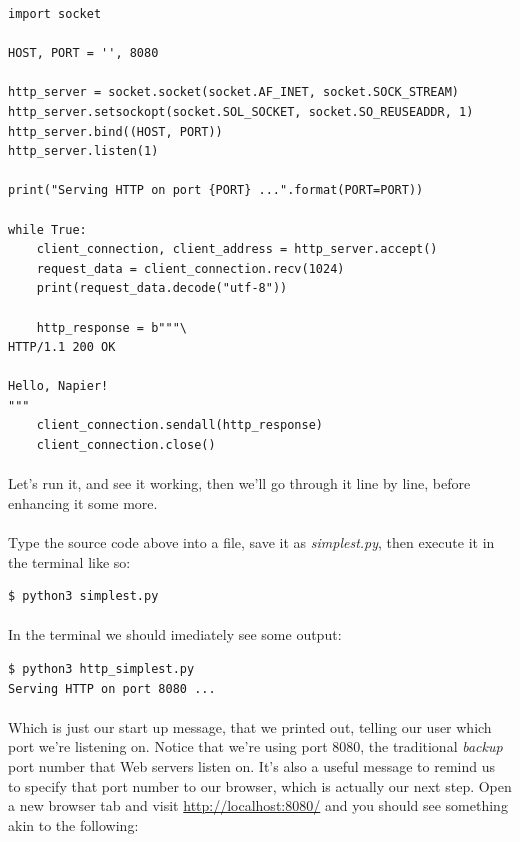 \begin{lstlisting}
import socket

HOST, PORT = '', 8080

http_server = socket.socket(socket.AF_INET, socket.SOCK_STREAM)
http_server.setsockopt(socket.SOL_SOCKET, socket.SO_REUSEADDR, 1)
http_server.bind((HOST, PORT))
http_server.listen(1)

print("Serving HTTP on port {PORT} ...".format(PORT=PORT))

while True:
    client_connection, client_address = http_server.accept()
    request_data = client_connection.recv(1024)
    print(request_data.decode("utf-8"))

    http_response = b"""\
HTTP/1.1 200 OK

Hello, Napier!
"""
    client_connection.sendall(http_response)
    client_connection.close()
\end{lstlisting}

\paragraph{} Let's run it, and see it working, then we'll go through it line by line, before enhancing it some more.

\paragraph{} Type the source code above into a file, save it as \emph{simplest.py}, then execute it in the terminal like so:

\begin{lstlisting}[style=DOS]
$ python3 simplest.py
\end{lstlisting}

\paragraph{} In the terminal we should imediately see some output:

\begin{lstlisting}[style=DOS]
$ python3 http_simplest.py 
Serving HTTP on port 8080 ...
\end{lstlisting}

\paragraph{} Which is just our start up message, that we printed out, telling our user which port we're listening on. Notice that we're using port 8080, the traditional \emph{backup} port number that Web servers listen on. It's also a useful message to remind us to specify that port number to our browser, which is actually our next step. Open a new browser tab and visit \url{http://localhost:8080/} and you should see something akin to the following:

